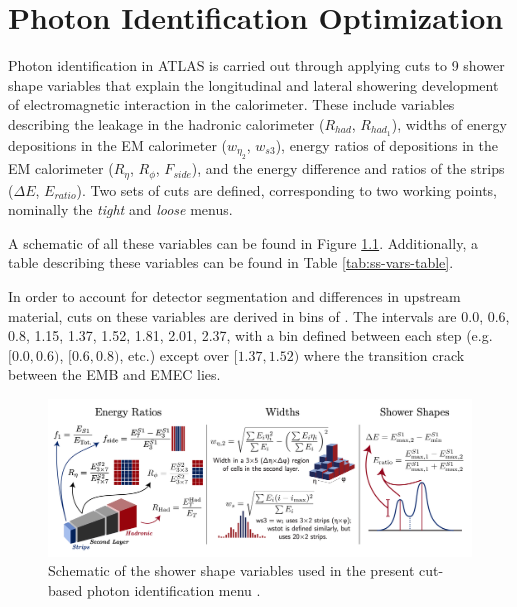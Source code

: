 \chapter{Photon Identification Optimization}

Photon identification in ATLAS is carried out through applying cuts to 9 shower shape variables that explain the longitudinal and lateral showering development of electromagnetic interaction in the calorimeter. These include variables describing the leakage in the hadronic calorimeter ($R_{had}$, $R_{had_1}$), widths of energy depositions in the \gls{EM} calorimeter ($w_{\eta_2}$, $w_{s3}$), energy ratios of depositions in the \gls{EM} calorimeter ($R_{\eta}$, $R_{\phi}$, $F_{side}$), and the energy difference and ratios of the strips ($\Delta E$, $E_{ratio}$). Two sets of cuts are defined, corresponding to two working points, nominally the \textit{tight} and \textit{loose} menus.

A schematic of all these variables can be found in Figure \ref{fig:ss-vars-schematic}. Additionally, a table describing these variables can be found in Table \ref{tab:ss-vars-table}.


In order to account for detector segmentation and differences in upstream material, cuts on these variables are derived in bins of \abseta. The intervals are 0.0, 0.6, 0.8, 1.15, 1.37, 1.52, 1.81, 2.01, 2.37, with a bin defined between each step (e.g. $[0.0,0.6)$, $[0.6,0.8)$, etc.) except over $[1.37,1.52)$ where the transition crack between the \gls{EMB} and \gls{EMEC} lies. 

\begin{figure}[!thp]
    \centering
    \includegraphics[width=.98\textwidth]{chapters/chapter4_photonID/images/ss-vars.png}
    \caption[Schematic of the shower shape variables used in the present cut-based photon identification menu.]
    {Schematic of the shower shape variables used in the present cut-based photon identification menu \cite{ss-var-schematic}.}
    \label{fig:ss-vars-schematic}
\end{figure}

